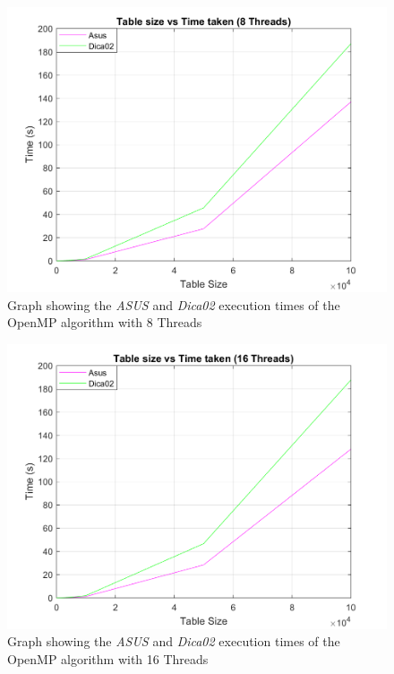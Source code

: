 \documentclass[10pt, conference]{IEEEtran}
\begin{document}
\begin{figure}[h!]
\renewcommand{\thefigure}{\arabic{figure}}
\centering
\includegraphics[scale=0.30]{Thread8.png}
\caption{Graph showing the \emph{ASUS} and \emph{Dica02} execution times of the OpenMP algorithm with 8 Threads}
\label{fig: OpenMP Thread8}
\end{figure}
\begin{figure}[h!]
\renewcommand{\thefigure}{\arabic{figure}}
\centering
\includegraphics[scale=0.30]{Thread16.png}
\caption{Graph showing the \emph{ASUS} and \emph{Dica02} execution times of the OpenMP algorithm with 16 Threads}
\label{fig: OpenMP Thread16}
\end{figure}
\end{document}
